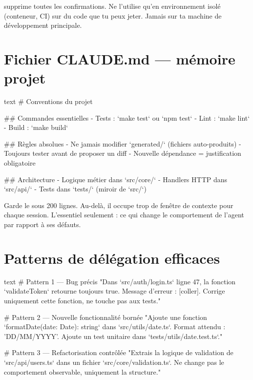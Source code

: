 \begin{avertissement}
 supprime toutes les confirmations. Ne
l'utilise qu'en environnement isolé (conteneur, CI) sur du code que tu peux
jeter. Jamais sur ta machine de développement principale.
\end{avertissement}

\section{Fichier CLAUDE.md — mémoire projet}


\begin{extraitcode}{text}
# Conventions du projet

## Commandes essentielles
- Tests : `make test` ou `npm test`
- Lint : `make lint`
- Build : `make build`

## Règles absolues
- Ne jamais modifier `generated/` (fichiers auto-produits)
- Toujours tester avant de proposer un diff
- Nouvelle dépendance = justification obligatoire

## Architecture
- Logique métier dans `src/core/`
- Handlers HTTP dans `src/api/`
- Tests dans `tests/` (miroir de `src/`)
\end{extraitcode}

\begin{astuce}
Garde le  sous 200 lignes. Au-delà, il occupe trop de fenêtre
de contexte pour chaque session. L'essentiel seulement : ce qui change le
comportement de l'agent par rapport à ses défauts.
\end{astuce}

\section{Patterns de délégation efficaces}


\begin{extraitcode}{text}
# Pattern 1 — Bug précis
"Dans `src/auth/login.ts` ligne 47, la fonction `validateToken`
retourne toujours true. Message d'erreur : [coller]. Corrige uniquement
cette fonction, ne touche pas aux tests."

# Pattern 2 — Nouvelle fonctionnalité bornée
"Ajoute une fonction `formatDate(date: Date): string` dans
`src/utils/date.ts`. Format attendu : 'DD/MM/YYYY'. Ajoute un test
unitaire dans `tests/utils/date.test.ts`."

# Pattern 3 — Refactorisation contrôlée
"Extrais la logique de validation de `src/api/users.ts` dans un
fichier `src/core/validation.ts`. Ne change pas le comportement
observable, uniquement la structure."
\end{extraitcode}

